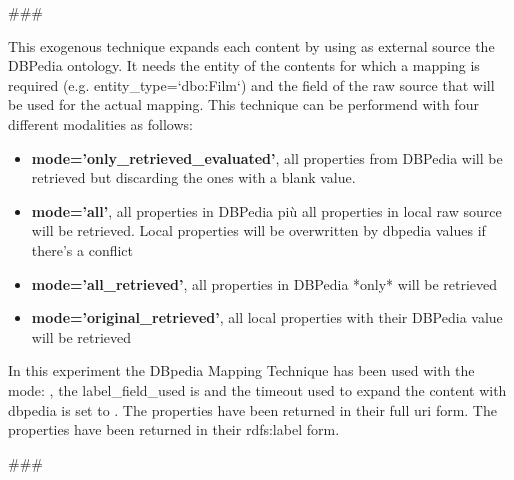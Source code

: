 
%

 ###

 This exogenous technique expands each content by using as external source the DBPedia ontology.
 It needs the entity of the contents for which a mapping is required (e.g. entity_type=`dbo:Film`)
 and the field of the raw source that will be used for the actual mapping. This technique can be performend
 with four different modalities as follows:

\begin{itemize}
 \item \begin{minipage}
           \textbf{mode='only_retrieved_evaluated'}, all properties from DBPedia will be retrieved but discarding the
            ones with a blank value.
        \end{minipage}
 \item \begin{minipage}
           \textbf{mode='all'}, all properties in DBPedia più all properties in local raw source will be retrieved.
            Local properties will be overwritten by dbpedia values if there's a conflict
        \end{minipage}
 \item \begin{minipage}
           \textbf{mode='all_retrieved'}, all properties in DBPedia *only* will be retrieved
       \end{minipage}
 \item \begin{minipage}
           \textbf{mode='original_retrieved'}, all local properties with their DBPedia value will be retrieved
       \end{minipage}
\end{itemize}

\hfill\break

In this experiment the DBpedia Mapping Technique has been used with the mode:
, the label_field_used is
 and the timeout used
to expand the content with dbpedia is set to
.
The properties have been returned in their full uri form.
The properties have been returned in their rdfs:label form.

\hfill\break

###

%